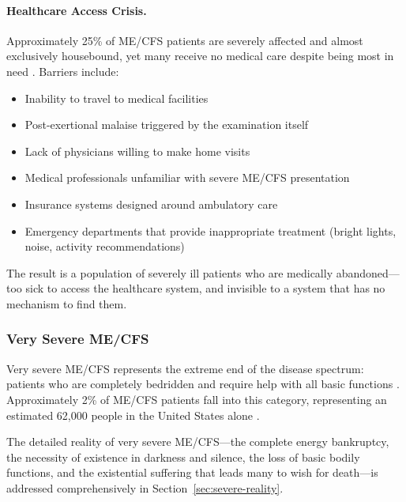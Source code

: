 \paragraph{Healthcare Access Crisis.}
Approximately 25\% of ME/CFS patients are severely affected and almost exclusively housebound, yet many receive no medical care despite being most in need \cite{Kingdon2020housebound}. Barriers include:
\begin{itemize}
    \item Inability to travel to medical facilities
    \item Post-exertional malaise triggered by the examination itself
    \item Lack of physicians willing to make home visits
    \item Medical professionals unfamiliar with severe ME/CFS presentation
    \item Insurance systems designed around ambulatory care
    \item Emergency departments that provide inappropriate treatment (bright lights, noise, activity recommendations)
\end{itemize}

The result is a population of severely ill patients who are medically abandoned---too sick to access the healthcare system, and invisible to a system that has no mechanism to find them.

\subsubsection{Very Severe ME/CFS}

Very severe ME/CFS represents the extreme end of the disease spectrum: patients who are completely bedridden and require help with all basic functions \cite{Carruthers2011ICC}. Approximately 2\% of ME/CFS patients fall into this category, representing an estimated 62,000 people in the United States alone \cite{Pendergrast2020housebound}.

The detailed reality of very severe ME/CFS---the complete energy bankruptcy, the necessity of existence in darkness and silence, the loss of basic bodily functions, and the existential suffering that leads many to wish for death---is addressed comprehensively in Section~\ref{sec:severe-reality}.

